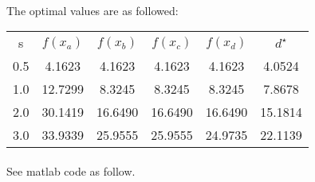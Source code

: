 \paragraph{}
The optimal values are as followed:
\begin{center}
	\begin{tabular}{ c | c | c | c | c | c}
		s   & $f(x_a)$ & $f(x_b)$ & $f(x_c)$ & $f(x_d)$ & $d^\star$ \\ 
		0.5 & 4.1623   & 4.1623   & 4.1623   & 4.1623   & 4.0524    \\  
		1.0 & 12.7299  & 8.3245   & 8.3245   & 8.3245   & 7.8678    \\ 
		2.0 & 30.1419  & 16.6490  & 16.6490  & 16.6490  & 15.1814   \\ 
		3.0 & 33.9339  & 25.9555  & 25.9555  & 24.9735  & 22.1139   \\ 
	\end{tabular}
\end{center}
\paragraph{}
See matlab code as follow.
